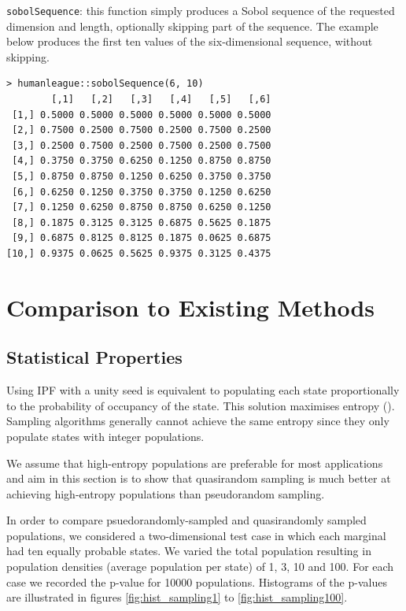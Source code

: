\documentclass{JASSS}
\newenvironment{Shaded}{\begin{snugshade}}{\end{snugshade}}
\begin{document}
\texttt{sobolSequence}: this function simply produces a Sobol sequence of the requested dimension and length, optionally skipping part of the sequence. The example below produces the first ten values of the six-dimensional sequence, without skipping.
\begin{Shaded}
\begin{verbatim}
> humanleague::sobolSequence(6, 10)
        [,1]   [,2]   [,3]   [,4]   [,5]   [,6]
 [1,] 0.5000 0.5000 0.5000 0.5000 0.5000 0.5000
 [2,] 0.7500 0.2500 0.7500 0.2500 0.7500 0.2500
 [3,] 0.2500 0.7500 0.2500 0.7500 0.2500 0.7500
 [4,] 0.3750 0.3750 0.6250 0.1250 0.8750 0.8750
 [5,] 0.8750 0.8750 0.1250 0.6250 0.3750 0.3750
 [6,] 0.6250 0.1250 0.3750 0.3750 0.1250 0.6250
 [7,] 0.1250 0.6250 0.8750 0.8750 0.6250 0.1250
 [8,] 0.1875 0.3125 0.3125 0.6875 0.5625 0.1875
 [9,] 0.6875 0.8125 0.8125 0.1875 0.0625 0.6875
[10,] 0.9375 0.0625 0.5625 0.9375 0.3125 0.4375
\end{verbatim}
\end{Shaded}

\section{Comparison to Existing
Methods}\label{comparison-to-existing-methods}

\subsection{Statistical Properties}\label{statistical-properties}

Using IPF with a unity seed is equivalent to populating each state proportionally to the probability of occupancy of the state. This solution maximises entropy (\cite{lovelace_evaluating_2015}). Sampling algorithms generally cannot achieve the same entropy since they only populate states with integer populations. 

We assume that high-entropy populations are preferable for most applications and aim in this section is to show that quasirandom sampling is much better at achieving high-entropy populations than pseudorandom sampling.   

In order to compare psuedorandomly-sampled and quasirandomly sampled populations, we considered a two-dimensional test case in which each marginal had ten equally probable states. We varied the total population resulting in population densities (average population per state) of 1, 3, 10 and 100. For each case we recorded the p-value for 10000 populations. Histograms of the p-values are illustrated in figures \ref{fig:hist_sampling1} to \ref{fig:hist_sampling100}.
\end{document}
